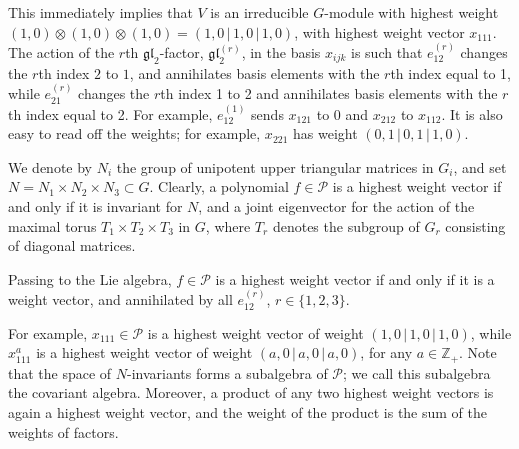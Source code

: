 \documentclass[reqno,11pt]{amsart}
\theoremstyle{remark}
\theoremstyle{definition}
\numberwithin{equation}{section}
\newcommand{\bbar}{\,\big|\,}
\newcommand{\frgl}{\mathfrak{gl}}
\newcommand{\bbZ}{\mathbb{Z}}
\newcommand{\Pol}{\mathcal{P}}
\begin{document}
This immediately implies that $V$ is an irreducible $G$-module with highest weight $(1,0)\otimes(1,0)\otimes(1,0)=(1,0\bbar 1,0\bbar 1,0)$, with highest weight vector $x_{111}$. The action of the $r$th $\frgl_2$-factor, $\frgl_2^{(r)}$, in the basis $x_{ijk}$ is such that $e_{12}^{(r)}$ changes the $r$th index $2$ to $1$, and annihilates basis elements with the $r$th index equal to 1, while $e_{21}^{(r)}$ changes the $r$th index 1 to 2 and annihilates basis elements with the $r$th index equal to 2. For example, $e_{12}^{(1)}$ sends $x_{121}$ to 0 and $x_{212}$ to $x_{112}$. It is also easy to read off the weights; for example, $x_{221}$ has weight $(0,1\bbar 0,1\bbar 1,0)$. 

We denote by $N_i$ the group of unipotent upper triangular matrices in $G_i$, and set $N=N_1\times N_2\times N_3\subset G$. Clearly, a polynomial $f\in \Pol$ is a highest weight vector if and only if it is invariant for $N$, and a joint eigenvector for the action of the maximal torus $T_1\times T_2\times T_3$ in $G$, where $T_r$ denotes the subgroup of $G_r$ consisting of diagonal matrices.

Passing to the Lie algebra, $f\in \Pol$ is a highest weight vector if and only if it is a weight vector, and annihilated by all $e_{12}^{(r)}$, $r\in\{1,2,3\}$.

For example, $x_{111}\in\Pol$ is a highest weight vector of weight $(1,0\bbar 1,0\bbar 1,0)$, while 
$x_{111}^a$ is a highest weight vector of weight $(a,0\bbar a,0\bbar a,0)$, for any $a\in\bbZ_+$.
Note that the space of $N$-invariants forms a subalgebra of $\Pol$; we call this subalgebra the covariant algebra. Moreover, a product of any two highest weight vectors is again a highest weight vector, and the weight of the product is the sum of the weights of factors.
\end{document}

